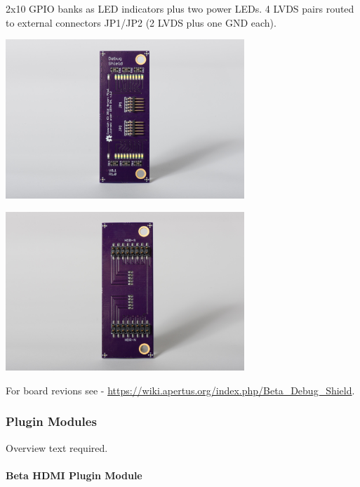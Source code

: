 2x10 GPIO banks as LED indicators plus two power LEDs. 4 LVDS pairs routed to external connectors JP1/JP2 (2 LVDS plus one GND each). 

\begin{center}
\includegraphics[height=6cm]{images/Debug-shield-bot01}
\end{center}

\begin{center}
\includegraphics[height=6cm]{images/Debug-shield-top01}
\end{center}

For board revions see - \href{https://wiki.apertus.org/index.php/Beta_Debug_Shield}{https://wiki.apertus.org/index.php/Beta\_Debug\_Shield}.\\







\subsubsection{Plugin Modules}

Overview text required.

\paragraph{Beta HDMI Plugin Module}\mbox{}\\

